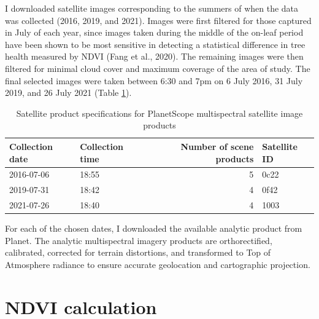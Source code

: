 \documentclass[12pt,twoside]{reedthesis}
\begin{document}
I downloaded satellite images corresponding to the summers of when the
data was collected (2016, 2019, and 2021). Images were first filtered
for those captured in July of each year, since images taken during the
middle of the on-leaf period have been shown to be most sensitive in
detecting a statistical difference in tree health measured by NDVI
(Fang et al., 2020). The remaining images were then filtered for minimal cloud
cover and maximum coverage of the area of study. The final selected
images were taken between 6:30 and 7pm on 6 July 2016, 31 July 2019, and
26 July 2021 (Table \ref{tab:sat-products}).
\begin{longtable}[t]{llrl}
\caption[Satellite product specifications]{\label{tab:sat-products}Satellite product specifications for PlanetScope multispectral satellite image products}\\
\toprule
Collection date & Collection time & Number of scene products & Satellite ID\\
\midrule
2016-07-06 & 18:55 & 5 & 0c22\\
2019-07-31 & 18:42 & 4 & 0f42\\
2021-07-26 & 18:40 & 4 & 1003\\
\bottomrule
\end{longtable}
For each of the chosen dates, I downloaded the available analytic
product from Planet. The analytic multispectral imagery products are
orthorectified, calibrated, corrected for terrain distortions, and
transformed to Top of Atmosphere radiance to ensure accurate geolocation
and cartographic projection.

\hypertarget{ndvi-calc-methods}{%
\section{NDVI calculation}\label{ndvi-calc-methods}}
\end{document}
